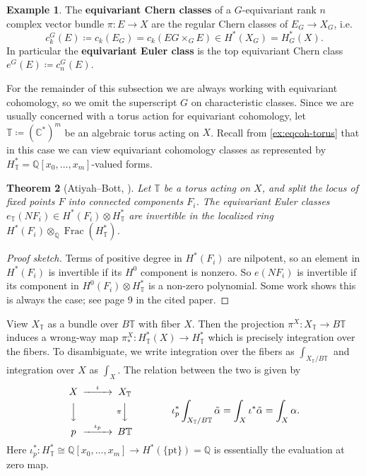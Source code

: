 \documentclass{report}
\theoremstyle{plain}
\newtheorem{theorem}{Theorem}[section]
\theoremstyle{definition}
\newtheorem{example}[theorem]{Example}
\theoremstyle{remark}
\newcommand{\bC}{\mathbb{C}}
\newcommand{\bT}{\mathbb{T}}
\newcommand{\bQ}{\mathbb{Q}}
\DeclareMathOperator{\Frac}{Frac}
\newcommand{\pt}{\mathrm{pt}}
\begin{document}
\begin{example}
  The {\bf equivariant Chern classes} of a $G$-equivariant rank $n$
  complex vector bundle $\pi\colon E \to X$ are the regular Chern
  classes of $E_G \to X_G$, i.e.
  \[ c_k^G(E) \coloneqq c_k(E_G) = c_k(EG \times_G E) \in H^*(X_G) = H^*_G(X). \]
  In particular the {\bf equivariant Euler class} is the top
  equivariant Chern class $e^G(E) \coloneqq c_n^G(E)$.
\end{example}

For the remainder of this subsection we are always working with
equivariant cohomology, so we omit the superscript $G$ on
characteristic classes. Since we are usually concerned with a torus
action for equivariant cohomology, let $\bT \coloneqq (\bC^*)^m$ be an
algebraic torus acting on $X$. Recall from \ref{ex:eqcoh-torus} that
in this case we can view equivariant cohomology classes as represented
by $H^*_{\bT} = \bQ[x_0, \ldots, x_m]$-valued forms.

\begin{theorem}[Atiyah--Bott, \cite{Atiyah1984}]
  Let $\bT$ be a torus acting on $X$, and split the locus of fixed
  points $F$ into connected components $F_i$. The equivariant Euler
  classes $e_{\bT}(NF_i) \in H^*(F_i) \otimes H^*_{\bT}$ are
  invertible in the localized ring $H^*(F_i) \otimes_{\bQ}
  \Frac(H^*_{\bT})$.
\end{theorem}

\begin{proof}[Proof sketch]
  Terms of positive degree in $H^*(F_i)$ are nilpotent, so an element
  in $H^*(F_i)$ is invertible if its $H^0$ component is nonzero. So
  $e(NF_i)$ is invertible if its component in $H^0(F_i) \otimes
  H^*_{\bT}$ is a non-zero polynomial. Some work shows this is always
  the case; see page 9 in the cited paper.
\end{proof}

View $X_{\bT}$ as a bundle over $B\bT$ with fiber $X$. Then the
projection $\pi^X\colon X_{\bT} \to B\bT$ induces a wrong-way map
$\pi^X_*\colon H^*_{\bT}(X) \to H^*_{\bT}$ which is precisely
integration over the fibers. To disambiguate, we write integration
over the fibers as $\int_{X_{\bT}/B\bT}$ and integration over $X$ as
  $\int_X$. The relation between the two is given by
\[ \begin{CD}
  X @>\iota>> X_{\bT} \\
  @VVV  @V\pi VV \\
  p @>\iota_p>> B\bT
\end{CD} \qquad\qquad
\iota^*_p\int_{X_{\bT}/B\bT} \tilde{\alpha} = \int_X \iota^*\tilde{\alpha} = \int_X \alpha. \]
Here $\iota^*_p\colon H^*_{\bT} \cong \bQ[x_0, \ldots, x_m] \to
H^*(\{\pt\}) = \bQ$ is essentially the evaluation at zero map.
\end{document}
